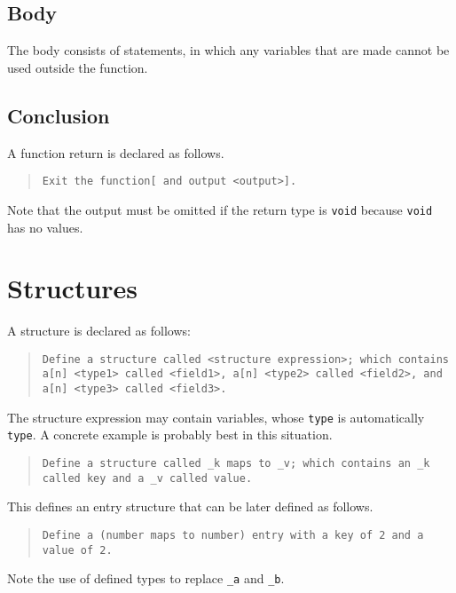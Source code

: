 \documentclass{article}
\newcommand{\code}[1]{\texttt{#1}}
\newcommand{\codeblock}[1]{\begin{quote}\code{#1}\end{quote}}
\begin{document}
\subsection{Body}
The body consists of statements, in which any variables that are made cannot be used outside the function.
\subsection{Conclusion}
A function return is declared as follows.

\codeblock{Exit the function[ and output <output>].}

Note that the output must be omitted if the return type is \code{void} because \code{void} has no values.

\section{Structures}
A structure is declared as follows:

\codeblock{Define a structure called <structure expression>; which contains a[n] <type1> called <field1>, a[n] <type2> called <field2>, and a[n] <type3> called <field3>.}

The structure expression may contain variables, whose \code{type} is automatically \code{type}. A concrete example is probably best in this situation.

\codeblock{Define a structure called \_{}k maps to \_{}v; which contains an \_{k} called key and a \_{v} called value.}

This defines an entry structure that can be later defined as follows.

\codeblock{Define a (number maps to number) entry with a key of 2 and a value of 2.}

Note the use of defined types to replace \code{\_{a}} and \code{\_{b}}.
\end{document}
